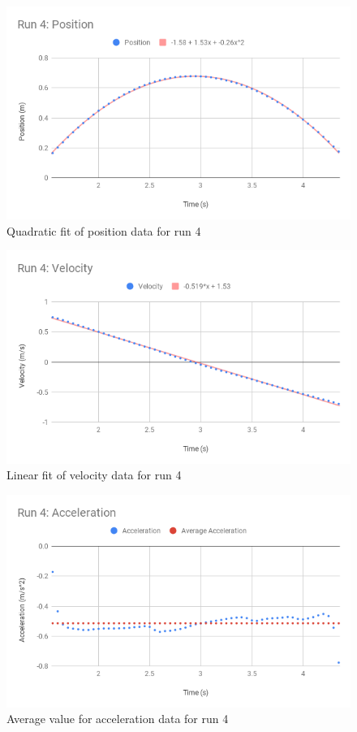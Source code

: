 %
\begin{figure}[ht]
    \centering
    \includegraphics[scale=0.71]{image/02-incline/Run-4-d.png}
    \caption{Quadratic fit of position data for run 4}
    \label{figure:02.fit.d}
\end{figure}
%
\begin{figure}[ht]
    \centering
    \includegraphics[scale=0.71]{image/02-incline/Run-4-v.png}
    \caption{Linear fit of velocity data for run 4}
    \label{figure:02.fit.v}
\end{figure}
%
\begin{figure}[ht]
    \centering
    \includegraphics[scale=0.71]{image/02-incline/Run-4-a.png}
    \caption{Average value for acceleration data for run 4}
    \label{figure:02.fit.a}
\end{figure}
%